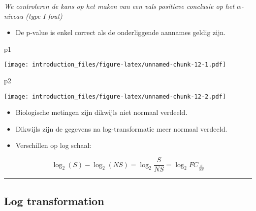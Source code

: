 \documentclass[
]{article}
\newenvironment{Shaded}{\begin{snugshade}}{\end{snugshade}}
\newcommand{\NormalTok}[1]{#1}
\providecommand{\tightlist}{%
  \setlength{\itemsep}{0pt}\setlength{\parskip}{0pt}}
\begin{document}
\emph{We controleren de kans op het maken van een vals positieve
conclusie op het \(\alpha\)-niveau (type I fout)}

\begin{itemize}
\tightlist
\item
  De p-value is enkel correct als de onderliggende aannames geldig zijn.
\end{itemize}

\begin{Shaded}
\begin{Highlighting}[]
\NormalTok{p1}
\end{Highlighting}
\end{Shaded}

\texttt{[image: introduction\_files/figure-latex/unnamed-chunk-12-1.pdf]}

\begin{Shaded}
\begin{Highlighting}[]
\NormalTok{p2}
\end{Highlighting}
\end{Shaded}

\texttt{[image: introduction\_files/figure-latex/unnamed-chunk-12-2.pdf]}

\begin{itemize}
\tightlist
\item
  Biologische metingen zijn dikwijls niet normaal verdeeld.
\item
  Dikwijls zijn de gegevens na log-transformatie meer normaal
  verdeeld.\\
\item
  Verschillen op log schaal:
\end{itemize}

\[
\log_2(S) - \log_2(NS) = \log_2 \frac{S}{NS} = \log_2 FC_{\frac{S}{NS}}
\]

\begin{center}\rule{0.5\linewidth}{0.5pt}\end{center}

\hypertarget{log-transformation}{%
\subsection{Log transformation}\label{log-transformation}}
\end{document}
